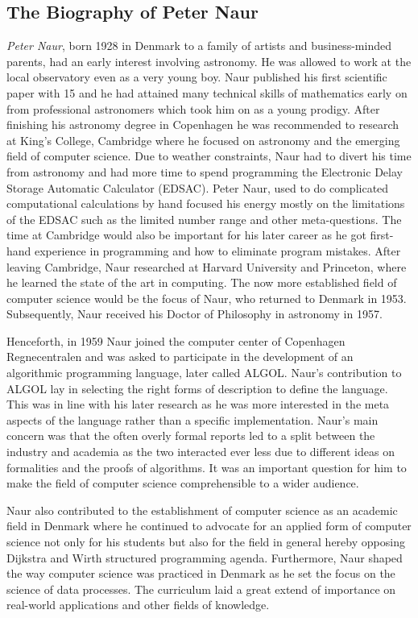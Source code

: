 \documentclass{article}
\begin{document}
\subsection{The Biography of Peter Naur}
\textit{Peter Naur}, born 1928 in Denmark to a family of artists and business-minded parents, had an early interest involving astronomy. He was allowed to work at the local observatory even as a very young boy. Naur published his first scientific paper with 15 and he had attained many technical skills of mathematics early on from professional astronomers which took him on as a young prodigy. After finishing his astronomy degree in Copenhagen he was recommended to research at King's College, Cambridge where he focused on astronomy and the emerging field of computer science. Due to weather constraints, Naur had to divert his time from astronomy and had more time to spend programming the Electronic Delay Storage Automatic Calculator (EDSAC). Peter Naur, used to do complicated computational calculations by hand focused his energy mostly on the limitations of the EDSAC such as the limited number range and other meta-questions. The time at Cambridge would also be important for his later career as he got first-hand experience in programming and how to eliminate program mistakes. After leaving Cambridge, Naur researched at Harvard University and Princeton, where he learned the state of the art in computing. The now more established field of computer science would be the focus of Naur, who returned to Denmark in 1953. Subsequently, Naur received his Doctor of Philosophy in astronomy in 1957.

Henceforth, in 1959 Naur joined the computer center of Copenhagen Regnecentralen and was asked to participate in the development of an algorithmic programming language, later called ALGOL. Naur's contribution to ALGOL lay in selecting the right forms of description to define the language. This was in line with his later research as he was more interested in the meta aspects of the language rather than a specific implementation. Naur's main concern was that the often overly formal reports led to a split between the industry and academia as the two interacted ever less due to different ideas on formalities and the proofs of algorithms. It was an important question for him to make the field of computer science comprehensible to a wider audience.

Naur also contributed to the establishment of computer science as an academic field in Denmark where he continued to advocate for an applied form of computer science not only for his students but also for the field in general hereby opposing Dijkstra and Wirth structured programming agenda. Furthermore, Naur shaped the way computer science was practiced in Denmark as he set the focus on the science of data processes. The curriculum laid a great extend of importance on real-world applications and other fields of knowledge.
\end{document}

